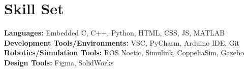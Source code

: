 \section*{Skill Set}
%
%
%
\begin{tasks}
  \task \textbf{Languages:} Embedded C, C++, Python, HTML, CSS, JS, MATLAB
  \task \textbf{Development Tools/Environments:} VSC, PyCharm, Arduino IDE, Git
  \task \textbf{Robotics/Simulation Tools:} ROS Noetic, Simulink, CoppeliaSim, Gazebo
  \task \textbf{Design Tools:} Figma, SolidWorks
\end{tasks}